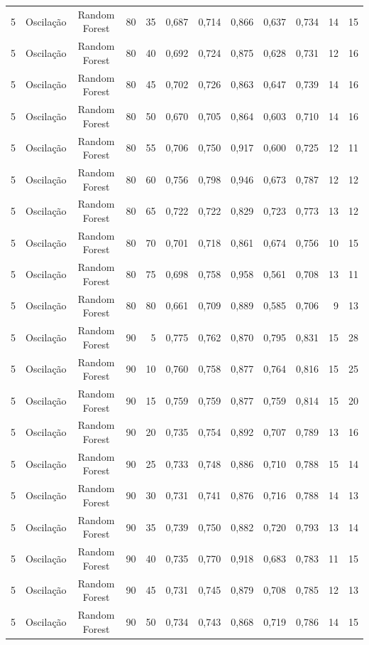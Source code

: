 \begin{longtable}{ccclrrrrrrrr}
5 & Oscilação & Random Forest & 80 & 35 & 0,687 & 0,714 & 0,866 & 0,637 & 0,734 & 14 & 15 \\
5 & Oscilação & Random Forest & 80 & 40 & 0,692 & 0,724 & 0,875 & 0,628 & 0,731 & 12 & 16 \\
5 & Oscilação & Random Forest & 80 & 45 & 0,702 & 0,726 & 0,863 & 0,647 & 0,739 & 14 & 16 \\
5 & Oscilação & Random Forest & 80 & 50 & 0,670 & 0,705 & 0,864 & 0,603 & 0,710 & 14 & 16 \\
5 & Oscilação & Random Forest & 80 & 55 & 0,706 & 0,750 & 0,917 & 0,600 & 0,725 & 12 & 11 \\
5 & Oscilação & Random Forest & 80 & 60 & 0,756 & 0,798 & 0,946 & 0,673 & 0,787 & 12 & 12 \\
5 & Oscilação & Random Forest & 80 & 65 & 0,722 & 0,722 & 0,829 & 0,723 & 0,773 & 13 & 12 \\
5 & Oscilação & Random Forest & 80 & 70 & 0,701 & 0,718 & 0,861 & 0,674 & 0,756 & 10 & 15 \\
5 & Oscilação & Random Forest & 80 & 75 & 0,698 & 0,758 & 0,958 & 0,561 & 0,708 & 13 & 11 \\
5 & Oscilação & Random Forest & 80 & 80 & 0,661 & 0,709 & 0,889 & 0,585 & 0,706 & 9 & 13 \\
5 & Oscilação & Random Forest & 90 & 5 & 0,775 & 0,762 & 0,870 & 0,795 & 0,831 & 15 & 28 \\
5 & Oscilação & Random Forest & 90 & 10 & 0,760 & 0,758 & 0,877 & 0,764 & 0,816 & 15 & 25 \\
5 & Oscilação & Random Forest & 90 & 15 & 0,759 & 0,759 & 0,877 & 0,759 & 0,814 & 15 & 20 \\
5 & Oscilação & Random Forest & 90 & 20 & 0,735 & 0,754 & 0,892 & 0,707 & 0,789 & 13 & 16 \\
5 & Oscilação & Random Forest & 90 & 25 & 0,733 & 0,748 & 0,886 & 0,710 & 0,788 & 15 & 14 \\
5 & Oscilação & Random Forest & 90 & 30 & 0,731 & 0,741 & 0,876 & 0,716 & 0,788 & 14 & 13 \\
5 & Oscilação & Random Forest & 90 & 35 & 0,739 & 0,750 & 0,882 & 0,720 & 0,793 & 13 & 14 \\
5 & Oscilação & Random Forest & 90 & 40 & 0,735 & 0,770 & 0,918 & 0,683 & 0,783 & 11 & 15 \\
5 & Oscilação & Random Forest & 90 & 45 & 0,731 & 0,745 & 0,879 & 0,708 & 0,785 & 12 & 13 \\
5 & Oscilação & Random Forest & 90 & 50 & 0,734 & 0,743 & 0,868 & 0,719 & 0,786 & 14 & 15 \\

\end{longtable}
